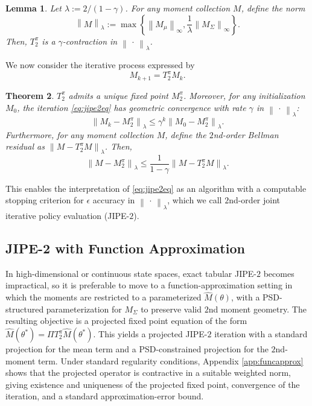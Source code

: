 \documentclass[accepted]{uai2026}
\theoremstyle{plain}
\newtheorem{theorem}{Theorem}[section]
\newtheorem{lemma}[theorem]{Lemma}
\theoremstyle{definition}
\theoremstyle{remark}
\newcommand{\LVert}{\left\lVert}
\newcommand{\RVert}{\right\rVert}
\newcommand{\1}{\mathbbm{1}}
\newcommand{\norm}[1]{\left\lVert #1\right\rVert}
\begin{document}
\begin{lemma}\label{lem:2contraction}
Let $\lambda := 2/(1-\gamma)$. For any moment collection $M$, define the norm
\begin{equation}
\norm{M}_{\lambda} := \max \left\{\norm{M_\mu}_\infty, \frac{1}{\lambda}\norm{M_\Sigma}_\infty \right\}.
\end{equation}
Then, $T^\pi_2$ is a $\gamma$-contraction in $\norm{\,\cdot\,}_{\lambda}$.
\end{lemma}
We now consider the iterative process expressed by 
\begin{equation}\label{eq:jipe2eq}
M_{k+1} = T^\pi_2 M_k.
\end{equation}
\begin{theorem}\label{thm:jipe2}
$T^\pi_2$ admits a unique fixed point $M^\pi_2$. Moreover, for any initialization $M_0$, the iteration \eqref{eq:jipe2eq} has geometric convergence with rate $\gamma$ in $\norm{\,\cdot\,}_{\lambda}$:
\begin{equation}
\LVert M_k - M^\pi_2\RVert_{\lambda} \le \gamma^k\LVert M_0 - M^{\pi}_2 \RVert_{\lambda}.
\end{equation}
Furthermore, for any moment collection $M$, define the $2$nd-order Bellman residual as $\LVert M - T^\pi_2 M\RVert_{\lambda}$.
Then,
\begin{equation}
\LVert M - M^\pi_2 \RVert_{\lambda} \le \frac{1}{1-\gamma}\LVert M - T^\pi_2 M\RVert_{\lambda}.
\end{equation}
\end{theorem}
This enables the interpretation of \eqref{eq:jipe2eq} as an algorithm with a computable stopping criterion for $\epsilon$ accuracy in $\norm{\,\cdot\,}_{\lambda}$, which we call $2$nd-order joint iterative policy evaluation (JIPE-$2$).

\subsection{JIPE-2 with Function Approximation}
In high-dimensional or continuous state spaces, exact tabular JIPE-$2$ becomes impractical, so it is preferable to move to a function-approximation setting in which the moments are restricted to a parameterized $\hat{M}(\theta)$, with a PSD-structured parameterization for $M_\Sigma$ to preserve valid $2$nd moment geometry. The resulting objective is a projected fixed point equation of the form $\hat{M}(\theta^*) = \Pi T^\pi_2 \hat{M}(\theta^*)$. This yields a projected JIPE-$2$ iteration with a standard projection for the mean term and a PSD-constrained projection for the $2$nd-moment term. Under standard regularity conditions, Appendix \ref{app:funcapprox} shows that the projected operator is contractive in a suitable weighted norm, giving existence and uniqueness of the projected fixed point, convergence of the iteration, and a standard approximation-error bound.
\end{document}
